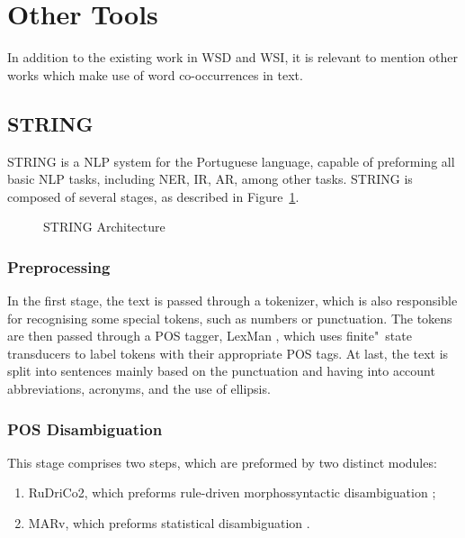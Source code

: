 \section{Other Tools}

In addition to the existing work in \ac{WSD} and \ac{WSI}, it is relevant to
mention other works which make use of word co-occurrences in text.

\subsection{STRING}
\label{sec:string}

\ac{STRING} \citep{mamede2012string} is a \ac{NLP} system for the Portuguese
language, capable of preforming all basic \ac{NLP} tasks, including \ac{NER},
\ac{IR}, \ac{AR}, among other tasks. \ac{STRING} is composed of several stages,
as described in Figure~\ref{fig:stringarch}.

\begin{figure}[ht]
 \caption{\acs*{STRING} Architecture}
 \label{fig:stringarch}
 \centering
 
\end{figure}

\subsubsection*{Preprocessing}

In the first stage, the text is passed through a tokenizer, which is also
responsible for recognising some special tokens, such as numbers or punctuation.
The tokens are then passed through a \ac{POS} tagger, LexMan
\citep{vicente2013lexman}, which uses finite"~state transducers to label tokens
with their appropriate \ac{POS} tags. At last, the text is split into sentences
mainly based on the punctuation and having into account abbreviations, acronyms,
and the use of ellipsis.

\subsubsection*{POS Disambiguation}

This stage comprises two steps, which are preformed by two distinct modules:

\begin{enumerate}
 \item \ac{RuDriCo2}, which preforms rule-driven morphossyntactic disambiguation
\citep{diniz2010conversor};
 \item \ac{MARv}, which preforms statistical disambiguation
\citep{ribeiro2003anotacao}.
\end{enumerate}

